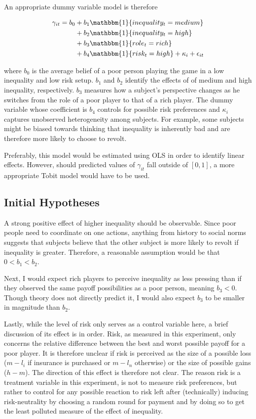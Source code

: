 \documentclass[12pt]{article}
\begin{document}
	An appropriate dummy variable model is therefore
	
	\begin{align*}
		\gamma_{it} = b_0 &+ b_1\mathbbm{1}\{inequality_t=medium\}\\
		&+ b_2\mathbbm{1}\{inequality_t=high\}\\
		&+ b_3\mathbbm{1}\{role_t=rich\}\\
		&+ b_4\mathbbm{1}\{risk_t=high\} + \kappa_i + \epsilon_{it}
	\end{align*}
	
	where $b_0$ is the average belief of a poor person playing the game in a 
	low inequality and low risk setup. $b_1$ and $b_2$ identify the effects of 
	of medium and high inequality, respectively. $b_3$ measures how a subject's 
	perspective changes as he switches from the role of a poor player to that 
	of a rich player. The dummy variable whose coefficient is $b_4$ controls 
	for possible risk preferences and $\kappa_i$ captures unobserved 
	heterogeneity among subjects. For example, some subjects might be biased 
	towards thinking that inequality is inherently bad and are therefore more 
	likely to choose to revolt.
	
	Preferably, this model would be estimated using OLS in order to identify 
	linear effects. However, should predicted values of $\gamma_{it}$ fall 
	outside of $[0,1]$, a more appropriate Tobit model would have to 
	be used.
	
	\subsection{Initial Hypotheses}
	A strong positive effect of higher inequality should be observable. Since 
	poor people need to coordinate on one actions, anything from history to 
	social norms suggests that subjects believe that the other subject is more 
	likely to revolt if inequality is greater. Therefore, a reasonable 
	assumption would be that $0<b_1<b_2$.
	
	Next, I would expect rich players to perceive inequality as less pressing 
	than if they observed the same payoff possibilities as a poor person, 
	meaning $b_3<0$. Though theory does not directly predict it, I would also 
	expect $b_3$ to be smaller in magnitude than $b_2$.
	
	Lastly, while the level of risk only serves as a control variable here, a 
	brief discussion of its effect is in order. Risk, as measured in this 
	experiment, only concerns the relative difference between the best and 
	worst possible payoff for a poor player. It is therefore unclear if risk is 
	perceived as the size of a possible loss ($m-l_i$ if insurance is purchased 
	or $m-l_n$ otherwise) or the size of possible gains ($h-m$). The direction 
	of this effect is therefore not clear. The reason risk is a treatment 
	variable in this experiment, is not to measure risk preferences, but rather 
	to control for any possible reaction to risk left after (technically) 
	inducing risk-neutrality by choosing a random round for payment and by 
	doing so to get the least polluted measure of the effect of inequality.
	
\end{document}
